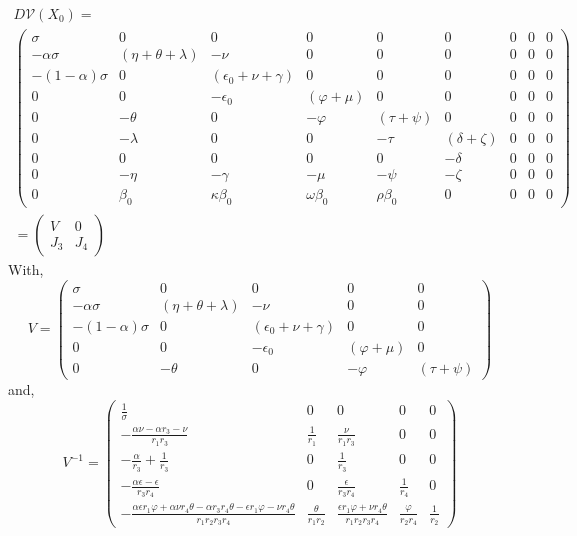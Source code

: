 \documentclass[authoryear,preprint]{elsarticle}
\begin{document}
\begin{equation}
\begin{split}
D \mathcal{V}(X_0) = \\
\begin{pmatrix}
\sigma & 0 & 0 & 0 & 0 & 0 &0 & 0 &0 \\
-\alpha \sigma & \left( \eta + \theta + \lambda\right)  & - \nu & 0 & 0 & 0 &0 & 0 &0 \\
-\left( 1- \alpha \right) \sigma & 0 & \left( \epsilon_0 + \nu + \gamma \right) & 0 & 0 & 0 &0 & 0 &0 \\
0 & 0 & - \epsilon_0 & \left( \varphi + \mu\right)  & 0 & 0 &0 & 0 &0 \\
0 & -\theta & 0 & -\varphi & \left( \tau + \psi\right)  & 0 &0 & 0 &0 \\
0 & -\lambda & 0 & 0 & -\tau & \left( \delta + \zeta\right)  &0 & 0 &0 \\
0 & 0 & 0 & 0 & 0 & -\delta &0 & 0 &0 \\
0 & -\eta & -\gamma & -\mu & -\psi & -\zeta &0 & 0 &0 \\
0 & \beta_0 & \kappa\beta_0 & \omega\beta_0 & \rho\beta_0 & 0 &0 & 0 &0
  \end{pmatrix}\\
  =\begin{pmatrix}
  V & 0\\
  J_3 & J_4
  \end{pmatrix}
\end{split}
\label{eqn:DFE-3}
\end{equation}
%
%
With,
%
%
\begin{equation}
V = \begin{pmatrix}
\sigma & 0 & 0 & 0 & 0\\
-\alpha \sigma & \left( \eta + \theta + \lambda\right)  & - \nu & 0 & 0\\
-\left( 1- \alpha \right) \sigma & 0 & \left( \epsilon_0 + \nu + \gamma \right) & 0 & 0\\
0 & 0 & - \epsilon_0 & \left( \varphi + \mu\right)  & 0\\
0 & -\theta & 0 & -\varphi & \left( \tau + \psi\right)
\end{pmatrix}
\label{eqn:DFE-4}
\end{equation}
%
%
and,
%
%
\begin{equation}
V^{-1} = 
\begin{pmatrix}
\frac{1}{\sigma} & 0 & 0 & 0 & 0\\
- \frac{\alpha \nu - \alpha r_{3} - \nu}{r_{1} r_{3}} & \frac{1}{r_{1}} & \frac{\nu}{r_{1} r_{3}} & 0 & 0\\
- \frac{\alpha}{r_{3}} + \frac{1}{r_{3}} & 0 & \frac{1}{r_{3}} & 0 & 0\\
- \frac{\alpha \epsilon - \epsilon}{r_{3} r_{4}} & 0 & \frac{\epsilon}{r_{3} r_{4}} & \frac{1}{r_{4}} & 0\\
- \frac{\alpha \epsilon r_{1} \varphi + \alpha \nu r_{4} \theta - \alpha r_{3} r_{4} \theta - \epsilon r_{1} \varphi - \nu r_{4} \theta}{r_{1} r_{2} r_{3} r_{4}} & \frac{\theta}{r_{1} r_{2}} & \frac{\epsilon r_{1} \varphi + \nu r_{4} \theta}{r_{1} r_{2} r_{3} r_{4}} & \frac{\varphi}{r_{2} r_{4}} & \frac{1}{r_{2}}
\end{pmatrix}
\label{eqn:DFE-5}
\end{equation}
\end{document}
